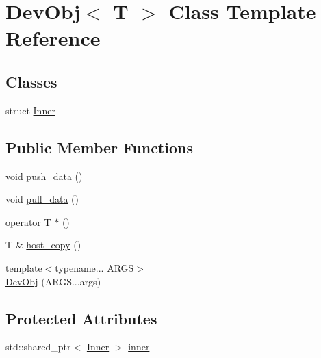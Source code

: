 \hypertarget{classDevObj}{\section{Dev\-Obj$<$ T $>$ Class Template Reference}
\label{classDevObj}
}
\subsection*{Classes}
\begin{DoxyCompactItemize}
\item 
struct \hyperlink{structDevObj_1_1Inner}{Inner}
\end{DoxyCompactItemize}
\subsection*{Public Member Functions}
\begin{DoxyCompactItemize}
\item 
void \hyperlink{classDevObj_a94496fe0bf2a9ab57411385c55cd6fd6}{push\-\_\-data} ()
\item 
void \hyperlink{classDevObj_a1cdf425fdc45b74cf1d6f6c80b3e9b54}{pull\-\_\-data} ()
\item 
\hyperlink{classDevObj_a7622c8011756653d7d57c28062a5126b}{operator T $\ast$} ()
\item 
T \& \hyperlink{classDevObj_a3de12445871df1a977f50c4f6bb0bed3}{host\-\_\-copy} ()
\item 
{\footnotesize template$<$typename... A\-R\-G\-S$>$ }\\\hyperlink{classDevObj_a7eee1567d75fe0211df6184f025ae225}{Dev\-Obj} (A\-R\-G\-S...\-args)
\end{DoxyCompactItemize}
\subsection*{Protected Attributes}
\begin{DoxyCompactItemize}
\item 
std\-::shared\-\_\-ptr$<$ \hyperlink{structDevObj_1_1Inner}{Inner} $>$ \hyperlink{classDevObj_ac8124c7da44aea36ee406d52f1a58db4}{inner}
\end{DoxyCompactItemize}


